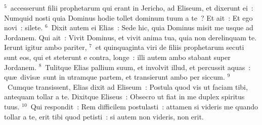 ${}^{5}$~accesserunt filii prophetarum qui erant in Jericho, ad Eliseum, et dixerunt ei~: Numquid nosti quia Dominus hodie tollet dominum tuum a te~? Et ait~: Et ego novi~: silete.
${}^{6}$~Dixit autem ei Elias~: Sede hic, quia Dominus misit me usque ad Jordanem. Qui ait~: Vivit Dominus, et vivit anima tua, quia non derelinquam te. Ierunt igitur ambo pariter,
${}^{7}$~et quinquaginta viri de filiis prophetarum secuti sunt eos, qui et steterunt e contra, longe~: illi autem ambo stabant super Jordanem.
${}^{8}$~Tulitque Elias pallium suum, et involvit illud, et percussit aquas~: qu\ae\ divis\ae\ sunt in utramque partem, et transierunt ambo per siccum.
${}^{9}$~Cumque transissent, Elias dixit ad Eliseum~: Postula quod vis ut faciam tibi, antequam tollar a te. Dixitque Eliseus~: Obsecro ut fiat in me duplex spiritus tuus.
${}^{10}$~Qui respondit~: Rem difficilem postulasti~: attamen si videris me quando tollar a te, erit tibi quod petisti~: si autem non videris, non erit.


